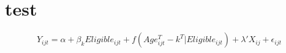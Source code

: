 \documentclass{article}%
\begin{document}

\section{test}

\blindtext

    \begin{equation*}%
        \nonumber
        Y_{ijt} = \alpha + \beta_kEligible_{ijt} + f (Age^T_{ijt}-k^T | 
        Eligible_{ijt}) + \lambda'X_{ij} + \epsilon_{ijt}
    \end{equation*}

\blindtext[3]
\end{document}
